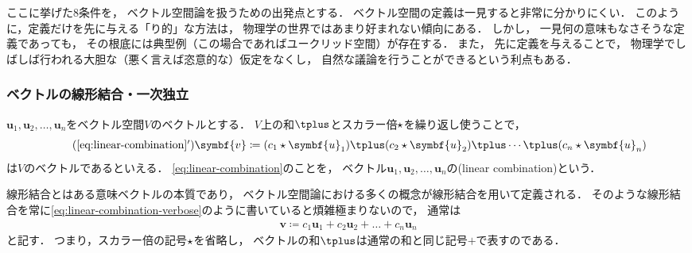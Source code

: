 \documentclass[
]{sotsu}
\begin{document}
ここに挙げた8条件を，
ベクトル空間論を扱うための出発点とする．
ベクトル空間の定義は一見すると非常に分かりにくい．
このように，定義だけを先に与える「り的」な方法は，
物理学の世界ではあまり好まれない傾向にある．
しかし，
一見何の意味もなさそうな定義であっても，
その根底には典型例（この場合であればユークリッド空間）が存在する．
また，
先に定義を与えることで，
物理学でしばしば行われる大胆な（悪く言えば恣意的な）仮定をなくし，
自然な議論を行うことができるという利点もある．


\subsubsection{ベクトルの線形結合・一次独立}
\label{sec:linear-combination-and-linearly-independent}

\quad
$\symbf{u}_1, \symbf{u}_2, \dots, \symbf{u}_n$をベクトル空間$V$のベクトルとする．
$V$上の和$\vecplus$とスカラー倍$\mathbin{\star}$を繰り返し使うことで，
\begin{equation}
    \label{eq:linear-combination-verbose}
    \tag{\ref*{eq:linear-combination}$'$}
        \symbf{v} \coloneq 
            (c_1 \scaprod \symbf{u}_1) \vecplus (c_2 \scaprod \symbf{u}_2) \vecplus \dotsb \vecplus (c_n \scaprod \symbf{u}_n)
\end{equation}
は$V$のベクトルであるといえる．
\cref{eq:linear-combination}のことを，
ベクトル$\symbf{u}_1, \symbf{u}_2, \dots, \symbf{u}_n$の(linear combination)という．

線形結合とはある意味ベクトルの本質であり，
ベクトル空間論における多くの概念が線形結合を用いて定義される．
そのような線形結合を常に\cref{eq:linear-combination-verbose}のように書いていると煩雑極まりないので，
通常は
\begin{equation}
    \label{eq:linear-combination}
    \begin{split}
        \symbf{v} \coloneq 
            c_1 \symbf{u}_1 + c_2 \symbf{u}_2 + \dots + c_n \symbf{u}_n
    \end{split}
\end{equation}
と記す．
つまり，スカラー倍の記号$\mathbin{\star}$を省略し，
ベクトルの和$\vecplus$は通常の和と同じ記号$+$で表すのである．
\end{document}
